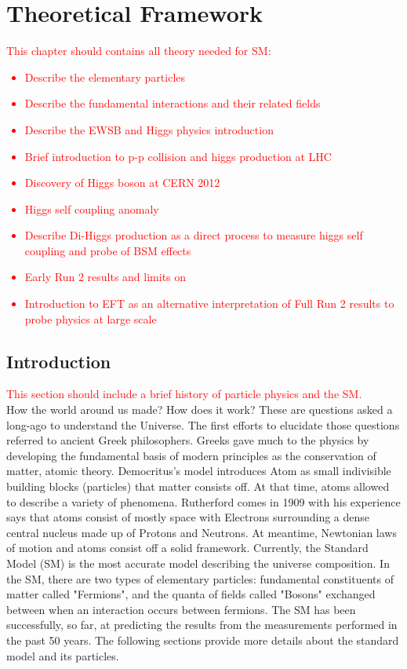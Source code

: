 \newpage
\chapter{Theoretical Framework}
\label{chap1}
\textcolor{red}{ This chapter should contains all theory needed for SM:
\begin{itemize}
    \item Describe the elementary particles 
    \item Describe the fundamental interactions and their related fields
    \item Describe the EWSB and Higgs physics introduction
    \item Brief introduction to p-p collision and higgs production at LHC
    \item Discovery of Higgs boson at CERN 2012
    \item Higgs self coupling anomaly
    \item Describe Di-Higgs production as a direct process to measure higgs self coupling and probe of BSM effects
    \item Early Run 2 results and limits on \kl
    \item Introduction to EFT as an alternative interpretation of Full Run 2 results to probe physics at large scale 
\end{itemize}
}
\section{Introduction}
\label{chap1:intro}

\textcolor{red}{This section should include a brief history of particle physics and the SM. \\
}
How the world around us made? How does it work? These are questions asked a long-ago to understand the Universe. The first efforts to elucidate those questions referred to ancient Greek philosophers. Greeks gave much to the physics by developing the fundamental basis of modern principles as the conservation of matter, atomic theory. Democritus's model introduces Atom as small indivisible building blocks (particles) that matter consists off. At that time, atoms allowed to describe a variety of phenomena. Rutherford comes in 1909 with his experience says that atoms consist of mostly space with Electrons surrounding a dense central nucleus made up of Protons and Neutrons. At meantime, Newtonian laws of motion and atoms consist off a solid framework. Currently, the Standard Model (SM) is the most accurate model describing the universe composition. In the SM, there are two types of elementary particles: fundamental constituents of matter called "Fermions", and the quanta of fields called "Bosons" exchanged between when an interaction occurs between fermions. The SM has been successfully, so far, at predicting the results from the measurements performed in the past 50 years. The following sections provide more details about the standard model and its particles.
